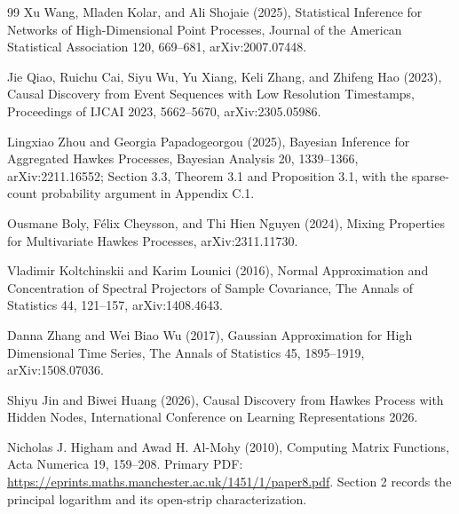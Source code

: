 \documentclass{article}
\begin{document}
\begin{thebibliography}{99}
   Xu Wang, Mladen Kolar, and Ali Shojaie (2025), Statistical Inference for Networks of High-Dimensional Point Processes, Journal of the American Statistical Association 120, 669--681, arXiv:2007.07448.

   Jie Qiao, Ruichu Cai, Siyu Wu, Yu Xiang, Keli Zhang, and Zhifeng Hao (2023), Causal Discovery from Event Sequences with Low Resolution Timestamps, Proceedings of IJCAI 2023, 5662--5670, arXiv:2305.05986.

   Lingxiao Zhou and Georgia Papadogeorgou (2025), Bayesian Inference for Aggregated Hawkes Processes, Bayesian Analysis 20, 1339--1366, arXiv:2211.16552; Section 3.3, Theorem 3.1 and Proposition 3.1, with the sparse-count probability argument in Appendix C.1.

   Ousmane Boly, F\'{e}lix Cheysson, and Thi Hien Nguyen (2024), Mixing Properties for Multivariate Hawkes Processes, arXiv:2311.11730.

   Vladimir Koltchinskii and Karim Lounici (2016), Normal Approximation and Concentration of Spectral Projectors of Sample Covariance, The Annals of Statistics 44, 121--157, arXiv:1408.4643.

   Danna Zhang and Wei Biao Wu (2017), Gaussian Approximation for High Dimensional Time Series, The Annals of Statistics 45, 1895--1919, arXiv:1508.07036.

   Shiyu Jin and Biwei Huang (2026), Causal Discovery from Hawkes Process with Hidden Nodes, International Conference on Learning Representations 2026.

   Nicholas J. Higham and Awad H. Al-Mohy (2010), Computing Matrix Functions, Acta Numerica 19, 159--208. Primary PDF: \url{https://eprints.maths.manchester.ac.uk/1451/1/paper8.pdf}. Section 2 records the principal logarithm and its open-strip characterization.

\end{thebibliography}
\end{document}
